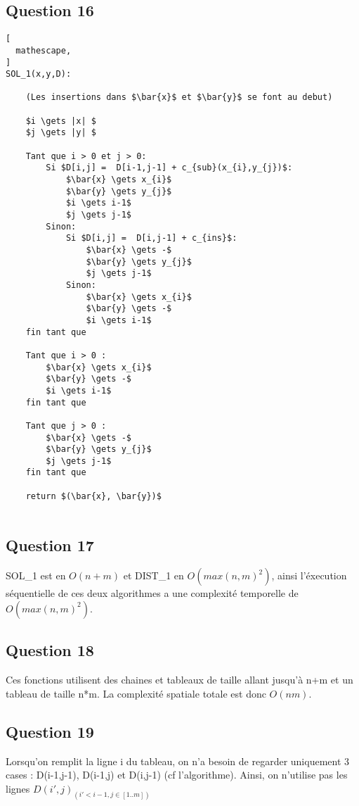\documentclass{report}
\begin{document}
\clearpage
\subsection*{Question 16}
\begin{lstlisting}[
  mathescape,
]
SOL_1(x,y,D):

    (Les insertions dans $\bar{x}$ et $\bar{y}$ se font au debut)
    
    $i \gets |x| $
    $j \gets |y| $

    Tant que i > 0 et j > 0:
        Si $D[i,j] =  D[i-1,j-1] + c_{sub}(x_{i},y_{j})$:
            $\bar{x} \gets x_{i}$
            $\bar{y} \gets y_{j}$
            $i \gets i-1$
            $j \gets j-1$
        Sinon:
            Si $D[i,j] =  D[i,j-1] + c_{ins}$:
                $\bar{x} \gets -$
                $\bar{y} \gets y_{j}$
                $j \gets j-1$
            Sinon:
                $\bar{x} \gets x_{i}$
                $\bar{y} \gets -$
                $i \gets i-1$
    fin tant que
                
    Tant que i > 0 :
        $\bar{x} \gets x_{i}$
        $\bar{y} \gets -$
        $i \gets i-1$
    fin tant que
        
    Tant que j > 0 :
        $\bar{x} \gets -$
        $\bar{y} \gets y_{j}$
        $j \gets j-1$
    fin tant que
    
    return $(\bar{x}, \bar{y})$
            
\end{lstlisting}

\clearpage

\subsection*{Question 17}
SOL\_1 est en $O(n+m)$ et DIST\_1 en $O(max(n,m)^{2})$, ainsi l'éxecution séquentielle de ces deux algorithmes a une complexité temporelle de  $O(max(n,m)^{2})$.

\subsection*{Question 18}
Ces fonctions utilisent des chaines et tableaux de taille allant jusqu'à n+m et un tableau de taille n*m. La complexité spatiale totale est donc $O(nm)$.

\subsection*{Question 19}
Lorsqu'on remplit la ligne i du tableau, on n'a besoin de regarder uniquement 3 cases : D(i-1,j-1), D(i-1,j) et D(i,j-1) (cf l'algorithme).
Ainsi, on n'utilise pas les lignes $D(i',j)_{(i'<i-1, j\in[1..m])}$
\end{document}
